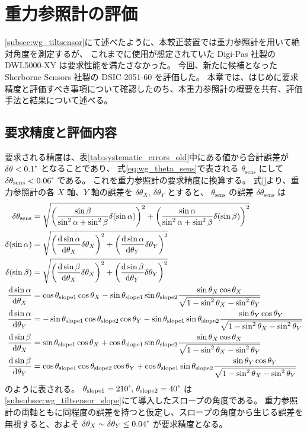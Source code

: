 \documentclass[../../main.tex]{subfiles}
\begin{document}
\chapter{重力参照計の評価}
\label{chap:tiltsensor}
\ref{subsec:wg_tiltsensor}にて述べたように、本較正装置では重力参照計を用いて絶対角度を測定するが、
これまでに使用が想定されていた Digi-Pas 社製の DWL5000-XY は要求性能を満たさなかった。
今回、新たに候補となった Sherborne Sensors 社製の DSIC-2051-60 を評価した。
本章では、はじめに要求精度と評価すべき事項について確認したのち、本重力参照計の概要を共有、評価手法と結果について述べる。
\section{要求精度と評価内容}
要求される精度は、表\ref{tab:systematic_errors_old}中にある値から合計誤差が $\delta\theta < 0.1\tcdegree$ となることであり、
式\eqref{eq:wg_theta_sens}で表される $\theta_{\mathrm{sens}}$ にして $\delta\theta_{\mathrm{sens}}<0.06\tcdegree$ である。
これを重力参照計の要求精度に換算する。
式\eqref{}より、重力参照計の各 $X$ 軸、$Y$ 軸の誤差を $\delta\theta_{X},\,\delta\theta_{Y}$ とすると、
$\theta_{\mathrm{sens}}$ の誤差 $\delta\theta_{\mathrm{sens}}$ は
\begin{align}
    \delta\theta_{\mathrm{sens}} &= 
        \sqrt{\qty(\dfrac{\sin\beta}{\sin^2\alpha+\sin^2\beta} \delta\qty(\sin\alpha))^2 + \qty(\dfrac{\sin\alpha}{\sin^2\alpha+\sin^2\beta} \delta\qty(\sin\beta))^2}\\ 
    \delta\qty(\sin\alpha) &= \sqrt{\qty(\dv{\sin\alpha}{\theta_X}\delta\theta_X)^2+\qty(\dv{\sin\alpha}{\theta_Y}\delta\theta_Y)^2}\\
    \delta\qty(\sin\beta) &= \sqrt{\qty(\dv{\sin\beta}{\theta_X}\delta\theta_X)^2+\qty(\dv{\sin\beta}{\theta_Y}\delta\theta_Y)^2} \\
    \dv{\sin\alpha}{\theta_X} &= \cos\theta_{\mathrm{slope}1}\cos\theta_X - \sin\theta_{\mathrm{slope}1}\sin\theta_{\mathrm{slope}2}\dfrac{\sin\theta_X\cos\theta_X}{\sqrt{1-\sin^2\theta_X-\sin^2\theta_Y}} \\
    \dv{\sin\alpha}{\theta_Y} &= -\sin\theta_{\mathrm{slope}1}\cos\theta_{\mathrm{slope}2}\cos\theta_Y - \sin\theta_{\mathrm{slope}1}\sin\theta_{\mathrm{slope}2}\dfrac{\sin\theta_Y\cos\theta_Y}{\sqrt{1-\sin^2\theta_X-\sin^2\theta_Y}} \\
    \dv{\sin\beta}{\theta_X} &= \sin\theta_{\mathrm{slope}1}\cos\theta_X + \cos\theta_{\mathrm{slope}1}\sin\theta_{\mathrm{slope}2}\dfrac{\sin\theta_X\cos\theta_X}{\sqrt{1-\sin^2\theta_X-\sin^2\theta_Y}} \\
    \dv{\sin\beta}{\theta_Y} &= \cos\theta_{\mathrm{slope}1}\cos\theta_{\mathrm{slope}2}\cos\theta_Y + \cos\theta_{\mathrm{slope}1}\sin\theta_{\mathrm{slope}2}\dfrac{\sin\theta_Y\cos\theta_Y}{\sqrt{1-\sin^2\theta_X-\sin^2\theta_Y}}
\end{align}
のように表される。
$\theta_{\mathrm{slope}1}=210\tcdegree,\,\theta_{\mathrm{slope}2}=40\tcdegree$ は\ref{subsubsec:wg_tiltsensor_slope}にて導入したスロープの角度である。
重力参照計の両軸ともに同程度の誤差を持つと仮定し、スロープの角度から生じる誤差を無視すると、およそ $\delta\theta_{X} \sim \delta\theta_{Y} \leq 0.04\tcdegree$ が要求精度となる。
\end{document}
